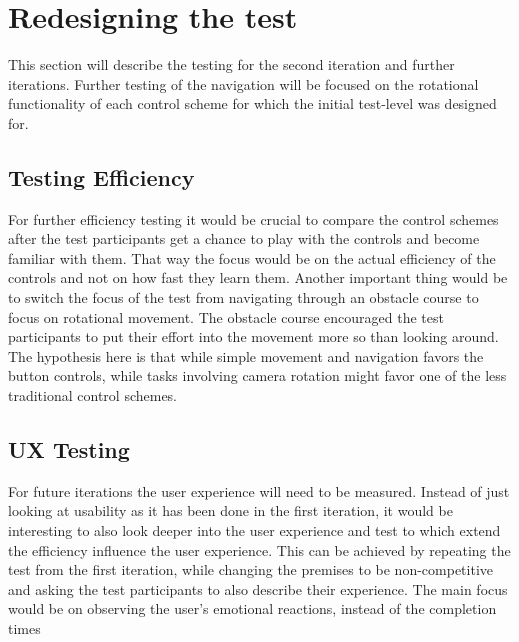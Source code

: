 \section{Redesigning the test}
This section will describe the testing for the second iteration and further iterations.
Further testing of the navigation will be focused on the rotational functionality of each control scheme for which the initial test-level was designed for. 

\subsection{Testing Efficiency}
For further efficiency testing it would be crucial to compare the control schemes after the test participants get a chance to play with the controls and become familiar with them.
That way the focus would be on the actual efficiency of the controls and not on how fast they learn them.
Another important thing would be to switch the focus of the test from navigating through an obstacle course to focus on rotational movement. The obstacle course encouraged the test participants to put their effort into the movement more so than looking around. The hypothesis here is that while simple movement and navigation favors the button controls, while tasks involving camera rotation might favor one of the less traditional control schemes.

\subsection{UX Testing} 
For future iterations the user experience will need to be measured.
Instead of just looking at usability as it has been done in the first iteration, it would be interesting to also look deeper into the user experience and test to which extend the efficiency influence the user experience.
This can be achieved by repeating the test from the first iteration, while changing the premises to be non-competitive and asking the test participants to also describe their experience.
The main focus would be on observing the user’s emotional reactions, instead of the completion times

